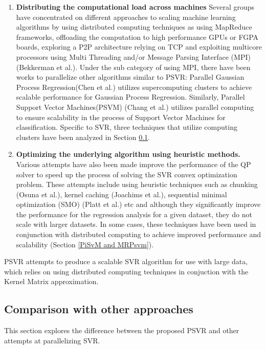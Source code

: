\documentclass[12pt]{article}
\begin{document}
\begin{enumerate}[label=(\alph*)]
\item {\bf Distributing the computational load across machines}
\newline
Several groups have concentrated on different approaches to scaling machine learning algorithms by using distributed computing techniques as using MapReduce frameworks, offloading the computation to high performance GPUs or FGPA boards, exploring a P2P architecture relying on TCP and exploiting multicore processors using Multi Threading and/or Message Parsing Interface (MPI)(Bekkerman et al.).
\newline \newline
Under the sub category of using MPI, there have been works to parallelize other algorithms similar to PSVR: Parallel Gaussian Process Regression(Chen et al.) utilizes supercomputing clusters to achieve scalable performance for Gaussian Process Regression. Similarly, Parallel Support Vector Machines(PSVM) (Chang et al.)  utilizes parallel computing to ensure scalability in the process of Support Vector Machines for classification. 
Specific to SVR, three techniques that utilize computing clusters have been analyzed in Section \ref{Comparison with other approaches}.
\item {\bf Optimizing the underlying algorithm using heuristic methods.}
\newline
Various attempts have also been made improve the performance of the QP solver to speed up the process of solving the SVR convex optimization problem. These attempts include using heuristic techniques such as chunking (Osuna et al.), kernel caching (Joachims et al.), sequential minimal optimization (SMO) (Platt et al.) etc and although they significantly improve the performance for the regression analysis for a given dataset, they do not scale with larger datasets. In some cases, these techniques have been used in conjunction with distributed computing to achieve improved performance and scalability (Section \ref{PiSvM and MRPsvm}).
\end{enumerate}
PSVR attempts to produce a scalable SVR algorithm for use with large data, which relies on using distributed computing techniques in conjuction with the Kernel Matrix approximation.
\subsection{Comparison with other approaches}
\label{Comparison with other approaches}
This section explores the difference between the proposed PSVR and other attempts at parallelizing SVR.
\end{document}
